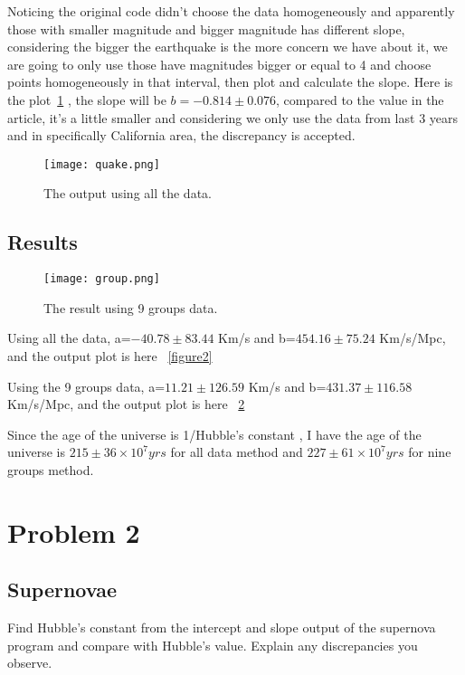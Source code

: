 \documentclass[11pt,letterpaper]{article}
\begin{document}
Noticing the original code didn't choose the data homogeneously and apparently those with smaller magnitude and bigger magnitude has different slope, considering the bigger the earthquake is the more concern we have about it, we are going to only use those have magnitudes bigger or equal to 4 and choose points homogeneously in that interval, then plot and calculate the slope. Here is the plot~\ref{figure1} 
, the slope will be $b=-0.814\pm0.076$, compared to the value in the article\cite{The Physics of Earthquakes}, it's a little smaller and considering we only use the data from last 3 years and in specifically California area, the discrepancy is accepted.
 
\begin{figure}
\begin{center}
\texttt{[image: quake.png]}
\caption{The output using all the data.}
\label{figure1}
\end{center}
\end{figure}





\subsection{Results}



\begin{figure}
\begin{center}
\texttt{[image: group.png]}
\caption{The result using 9 groups data.}
\label{figure3}
\end{center}
\end{figure}

Using all the data, a=$-40.78 \pm 83.44$ Km/s and b=$454.16 \pm 75.24$ Km/s/Mpc, and the output plot is here ~\ref{figure2}

Using the 9 groups data, a=$11.21 \pm 126.59$ Km/s and b=$431.37 \pm 116.58$ Km/s/Mpc, and the output plot is here ~\ref{figure3} 

Since the age of the universe is 1/Hubble's constant \cite{hubblewiki} , I have the age of the universe is $215 \pm 36\times10^7 yrs$ for all data method and $227 \pm 61\times10^7 yrs$ for nine groups method.

\newpage
\section{Problem 2}
\subsection{Supernovae}
Find Hubble's constant from the intercept and slope output of the supernova program and compare with Hubble's value. Explain any discrepancies you observe.
\end{document}
